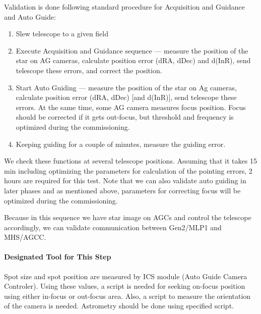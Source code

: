 Validation is done following standard procedure for Acquisition and Guidance and Auto Guide:
\begin{enumerate}
\item Slew telescope to a given field
\item Execute Acquisition and Guidance sequence --- measure the position of the star on AG cameras, calculate position error (dRA, dDec) and d(InR), send telescope these errors, and correct the position.
\item Start Auto Guiding --- measure the position of the star on Ag cameras, calculate position error (dRA, dDec) [and d(InR)], send telescope these errors.
At the same time, some AG camera measures focus position.
Focus should be corrected if it gets out-focus, but threshold and frequency is optimized during the commissioning.
\item Keeping guiding for a couple of minutes, measure the guiding error.
\end{enumerate}


We check these functions at several telescope positions.
Assuming that it takes 15 min including optimizing the parameters for calculation of the pointing errors, 2 hours are required for this test.
Note that we can also validate auto guiding in later phases and as mentioned above, parameters for correcting focus will be optimized during the commissioning.

\smallskip

Because in this sequence we have star image on AGCs  and control the telescope accordingly, we can validate communication between Gen2/MLP1 and MHS/AGCC.

\paragraph{Designated Tool for This Step}
Spot size and spot position are measured by ICS module (Auto Guide Camera Controler).
Using these values, a script is needed for seeking on-focus position using either in-focus or out-focus area.
Also, a script to measure the orientation of the camera is needed.
Astrometry should be done using specified script.

